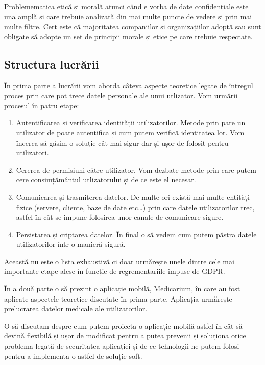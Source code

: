 \documentclass[12pt]{article}
\begin{document}
Problemematica etică și morală atunci când e vorba de date confidențiale este una amplă
și care trebuie analizată din mai multe puncte de vedere și prin mai multe filtre.
 Cert este că majoritatea companiilor
și organizațiilor adoptă sau sunt obligate să adopte un set de principii morale
și etice pe care trebuie respectate.


\newpage
\subsection{Structura lucrării}

În prima parte a lucrării vom aborda câteva aspecte teoretice legate de întregul proces
prin care pot trece datele personale ale unui utlizator.
Vom urmării procesul în patru etape:

\begin{enumerate}
    \item Autentificarea și verificarea identității utilizatorilor. Metode prin pare un utilizator 
    de poate autentifica și cum putem verifică
    identitatea lor. Vom încerca să găsim o soluție cât mai sigur dar și ușor de
    folosit pentru utilizatori.
    \item Cererea de permisiuni către utilizator. Vom dezbate metode prin
    care putem cere consimțământul utlizatorului și de ce este el necesar.
    \item Comunicarea și trasmiterea datelor. De multe ori există mai multe entități fizice 
    (servere, cliente, baze de date etc\dots) prin care datele utilizatorilor trec, 
    astfel în cât se impune folosirea unor canale de comunicare sigure.
    \item Persistarea și criptarea datelor. În final o să vedem cum putem păstra
    datele utilizatorilor într-o manieră sigură.  
\end{enumerate}

Această nu este o lista exhaustivă ci doar urmărește unele dintre cele mai importante 
etape alese în funcție de regrementariile impuse de GDPR. 

\bigskip

În a două parte o să prezint o aplicație mobilă, Medicarium, în care au fost aplicate
aspectele teoretice discutate în prima parte. Aplicația urmărește prelucrarea datelor
medicale ale utilizatorilor. 

O să discutam despre cum putem proiecta o aplicație mobilă astfel în cât
să devină flexibilă și ușor de modificat pentru a putea prevenii și soluționa orice
problema legată de securitatea aplicației și de ce tehnologii ne putem 
folosi pentru a implementa o astfel de soluție soft.
\end{document}
